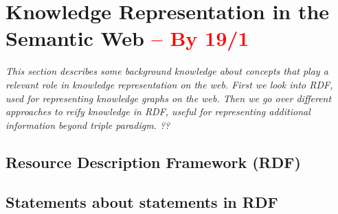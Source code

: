 \section{Knowledge Representation in the Semantic Web \textcolor{red}{-- By 19/1}}
\label{sec:chp2_semweb}

\textit{This section describes some background knowledge about concepts that play a relevant role in knowledge representation on the web. First we look into RDF, used for representing knowledge graphs on the web. Then we go over different approaches to reify knowledge in RDF, useful for representing additional information beyond triple paradigm. ??}

\subsection{Resource Description Framework (RDF)}


\subsection{Statements about statements in RDF}

